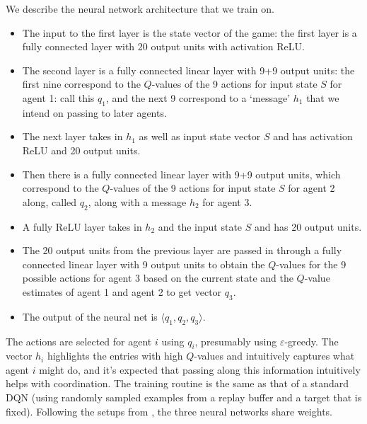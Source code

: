 \documentclass{article}
\begin{document}
We describe the neural network architecture that we train
on.
\begin{itemize}

\item The input to the first layer is the state vector of
the game: the first layer is a fully connected layer
with 20 output units with activation ReLU.

\item The second layer is a fully connected linear layer
with 9+9 output units: the first nine correspond to the $Q$-values
of the 9 actions for input state $S$ for agent 1: call
this $q_1$, and the next 9 correspond to a `message' $h_1$ that
we intend on passing to later agents.

\item The next layer takes in $h_1$ as well as input
state vector $S$ and has activation ReLU and 20 output
units.

\item Then there is a fully connected linear layer with
9+9 output units, which correspond to the $Q$-values
of the 9 actions for input state $S$ for agent 2
along, called $q_2$, along with a message $h_2$
for agent 3.

\item A fully ReLU layer takes in $h_2$ and the input
state $S$ and has 20 output units. 

\item The 20 output units from the previous layer are
passed in through a fully connected linear layer with
9 output units to obtain the $Q$-values for the 9
possible actions for agent 3 based on the current state
and the $Q$-value estimates of agent 1 and agent 2
to get vector $q_3$.

\item The output of the neural net is $\langle q_1,q_2,q_3
\rangle$.

\end{itemize}

The actions are selected for agent $i$ using $q_i$,
presumably using $\varepsilon$-greedy.
The vector $h_i$ highlights the entries with
high $Q$-values and intuitively captures
what agent $i$ might do, and it's expected that
passing along this information intuitively helps
with coordination. The training routine is the same as that
of a standard DQN (using randomly sampled examples from
a replay buffer and a target that is fixed).
Following the setups from \cite{foerster2016learning,
sukhbaatar2016learning}, the three neural networks share
weights.
\end{document}
